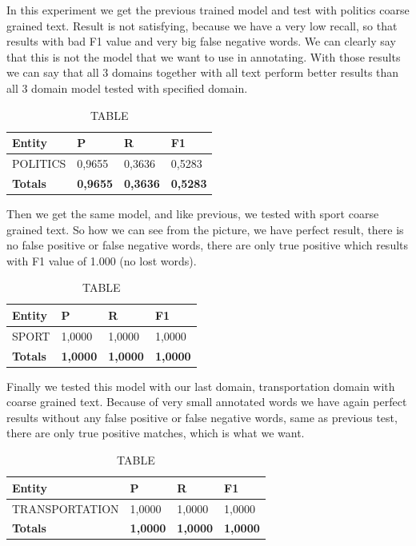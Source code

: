 \documentclass[thesis=M,english]{FITthesis}[2018/05/30]
\begin{document}
	In this experiment we get the previous trained model and test with politics coarse grained text. Result is not satisfying, because we have a very low recall, so that results with bad F1 value and very big false negative words. We can clearly say that this is not the model that we want to use in annotating. With those results we can say that all 3 domains together with all text perform better results than all 3 domain model tested with specified domain.  

	\begin{table}[H]\centering
		\caption{TABLE}
		\label{}
		\begin{tabular}{|l|l|l|l|}
			\hline {\textbf{Entity}} & {\textbf{P}} & {\textbf{R}} & {\textbf{F1}}\\\hline
				POLITICS & 0,9655 & 0,3636 & 0,5283\\\hline
				\textbf{Totals} & \textbf{0,9655} & \textbf{0,3636} & \textbf{0,5283}\\\hline
		\end{tabular}
	\end{table}

	Then we get the same model, and like previous, we tested with sport coarse grained text. So how we can see from the picture, we have perfect result, there is no false positive or false negative words, there are only true positive which results with F1 value of 1.000 (no lost words).
	\begin{table}[H]\centering
		\caption{TABLE}
		\label{}
		\begin{tabular}{|l|l|l|l|}
			\hline {\textbf{Entity}} & {\textbf{P}} & {\textbf{R}} & {\textbf{F1}}\\\hline
				SPORT & 1,0000 & 1,0000 & 1,0000\\\hline
				\textbf{Totals} & \textbf{1,0000} & \textbf{1,0000} & \textbf{1,0000}\\\hline
		\end{tabular}
	\end{table}	

	Finally we tested this model with our last domain, transportation domain with coarse grained text.	Because of very small annotated words we have again perfect results without any false positive or false negative words, same as previous test, there are only true positive matches, which is what we want.
	\begin{table}[H]\centering
		\caption{TABLE}
		\label{}
		\begin{tabular}{|l|l|l|l|}
			\hline {\textbf{Entity}} & {\textbf{P}} & {\textbf{R}} & {\textbf{F1}}\\\hline
				TRANSPORTATION & 1,0000 & 1,0000 & 1,0000\\\hline
				\textbf{Totals} & \textbf{1,0000} & \textbf{1,0000} & \textbf{1,0000}\\\hline
		\end{tabular}
	\end{table}
\end{document}
